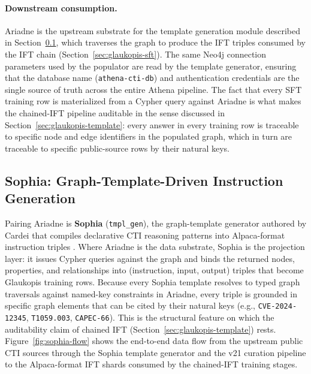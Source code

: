 \documentclass[webpdf,contemporary,large]{oup-authoring-template}
\providecommand{\hfid}[1]{{\small\nolinkurl{#1}}}
\theoremstyle{thmstyleone}
\theoremstyle{thmstyletwo}
\theoremstyle{thmstylethree}
\begin{document}
\paragraph{Downstream consumption.}
Ariadne is the upstream substrate for the template generation module described in Section~\ref{sec:ariadne-templates}, which traverses the graph to produce the IFT triples consumed by the IFT chain (Section~\ref{sec:glaukopis-sft}). The same Neo4j connection parameters used by the populator are read by the template generator, ensuring that the database name (\texttt{athena-cti-db}) and authentication credentials are the single source of truth across the entire Athena pipeline. The fact that every SFT training row is materialized from a Cypher query against Ariadne is what makes the chained-IFT pipeline auditable in the sense discussed in Section~\ref{sec:glaukopis-template}: every answer in every training row is traceable to specific node and edge identifiers in the populated graph, which in turn are traceable to specific public-source rows by their natural keys.

\subsection{Sophia: Graph-Template-Driven Instruction Generation}
\label{sec:ariadne-templates}

Pairing Ariadne is \textbf{Sophia} (\hfid{tmpl_gen}), the graph-template generator authored by Cardei that compiles declarative CTI reasoning patterns into Alpaca-format instruction triples \cite{cardei2025ift}. Where Ariadne is the data substrate, Sophia is the projection layer: it issues Cypher queries against the graph and binds the returned nodes, properties, and relationships into (instruction, input, output) triples that become Glaukopis training rows. Because every Sophia template resolves to typed graph traversals against named-key constraints in Ariadne, every triple is grounded in specific graph elements that can be cited by their natural keys (e.g., \hfid{CVE-2024-12345}, \texttt{T1059.003}, \hfid{CAPEC-66}). This is the structural feature on which the auditability claim of chained IFT (Section~\ref{sec:glaukopis-template}) rests. Figure~\ref{fig:sophia-flow} shows the end-to-end data flow from the upstream public CTI sources through the Sophia template generator and the v21 curation pipeline to the Alpaca-format IFT shards consumed by the chained-IFT training stages.
\end{document}
